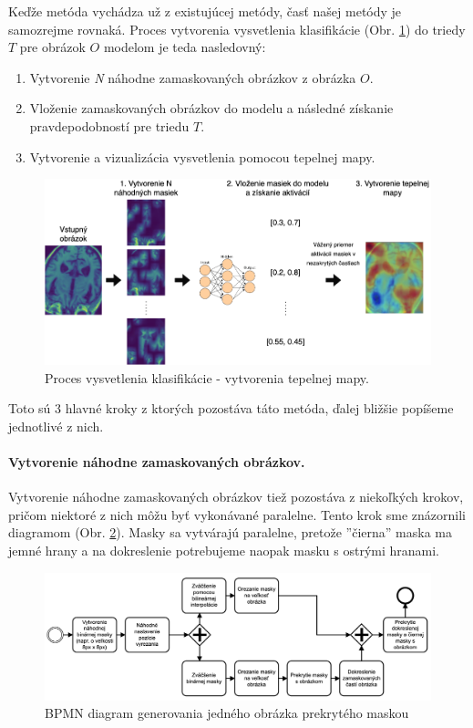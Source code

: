 Keďže metóda vychádza už z existujúcej metódy, časť našej metódy je samozrejme rovnaká. Proces vytvorenia vysvetlenia klasifikácie (Obr. \ref{fig:risei_heatmap_generation}) do triedy $T$ pre obrázok $O$ modelom je teda nasledovný:

\begin{enumerate}
    \item Vytvorenie \textit{N} náhodne zamaskovaných obrázkov z obrázka $O$.
    \item Vloženie zamaskovaných obrázkov do modelu a následné získanie pravdepodobností pre triedu $T$.
    \item Vytvorenie a vizualizácia vysvetlenia pomocou tepelnej mapy.
\end{enumerate}

\begin{figure}[h!]
    \centering
    \includegraphics[scale=0.35]{assets/images/risei_heatmap_generation.png}
    \caption{Proces vysvetlenia klasifikácie - vytvorenia tepelnej mapy.}
    \label{fig:risei_heatmap_generation}
\end{figure}

Toto sú 3 hlavné kroky z ktorých pozostáva táto metóda, ďalej bližšie popíšeme jednotlivé z nich.

\paragraph{Vytvorenie náhodne zamaskovaných obrázkov.}

Vytvorenie náhodne zamaskovaných obrázkov tiež pozostáva z niekoľkých krokov, pričom niektoré z nich môžu byť vykonávané paralelne. Tento krok sme znázornili diagramom (Obr. \ref{fig:risei_diagram}). Masky sa vytvárajú paralelne, pretože ''čierna'' maska ma jemné hrany a na dokreslenie potrebujeme naopak masku s ostrými hranami.

\begin{figure}[h!]
    \centering
    \includegraphics[scale=0.45]{assets/images/risei_diagram.png}
    \caption{BPMN diagram generovania jedného obrázka prekrytého maskou}
    \label{fig:risei_diagram}
\end{figure}

